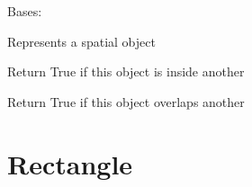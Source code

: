 \documentclass[letterpaper,10pt,english]{sphinxmanual}
\begin{document}
\begin{fulllineitems}
\label{geometry:serge.geometry.SpatialObject}
Bases: 

Represents a spatial object

\begin{fulllineitems}
\label{geometry:serge.geometry.SpatialObject.isInside}
Return True if this object is inside another

\end{fulllineitems}


\begin{fulllineitems}
\label{geometry:serge.geometry.SpatialObject.isOverlapping}
Return True if this object overlaps another

\end{fulllineitems}


\end{fulllineitems}



\section{Rectangle}
\label{geometry:rectangle}
\end{document}
